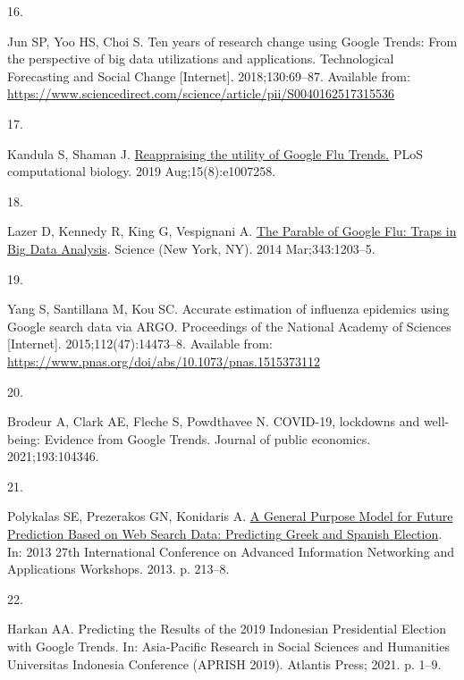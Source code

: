 \documentclass[
  letterpaper,
  DIV=11,
  numbers=noendperiod]{scrartcl}
\newlength{\cslhangindent}
\newlength{\csllabelwidth}
\newlength{\cslentryspacingunit} %
\newenvironment{CSLReferences}[2] %
 {%
  \setlength{\parindent}{0pt}
  \ifodd #1
  \let\oldpar\par
  \def\par{\hangindent=\cslhangindent\oldpar}
  \fi
  \setlength{\parskip}{#2\cslentryspacingunit}
 }%
 {}
\newcommand{\CSLLeftMargin}[1]{\parbox[t]{\csllabelwidth}{#1}}
\newcommand{\CSLRightInline}[1]{\parbox[t]{\linewidth - \csllabelwidth}{#1}\break}
\begin{document}
\begin{CSLReferences}{0}{0}
\leavevmode{}%
\CSLLeftMargin{16. }%
\CSLRightInline{Jun SP, Yoo HS, Choi S. Ten years of research change
using {Google} {Trends}: {From} the perspective of big data utilizations
and applications. Technological Forecasting and Social Change
{[}Internet{]}. 2018;130:69--87. Available from:
\url{https://www.sciencedirect.com/science/article/pii/S0040162517315536}}

\leavevmode{}%
\CSLLeftMargin{17. }%
\CSLRightInline{Kandula S, Shaman J.
\href{https://doi.org/10.1371/journal.pcbi.1007258}{Reappraising the
utility of {Google} {Flu} {Trends}.} PLoS computational biology. 2019
Aug;15(8):e1007258. }

\leavevmode{}%
\CSLLeftMargin{18. }%
\CSLRightInline{Lazer D, Kennedy R, King G, Vespignani A.
\href{https://doi.org/10.1126/science.1248506}{The {Parable} of {Google}
{Flu}: {Traps} in {Big} {Data} {Analysis}}. Science (New York, NY). 2014
Mar;343:1203--5. }

\leavevmode{}%
\CSLLeftMargin{19. }%
\CSLRightInline{Yang S, Santillana M, Kou SC. Accurate estimation of
influenza epidemics using {Google} search data via {ARGO}. Proceedings
of the National Academy of Sciences {[}Internet{]}.
2015;112(47):14473--8. Available from:
\url{https://www.pnas.org/doi/abs/10.1073/pnas.1515373112}}

\leavevmode{}%
\CSLLeftMargin{20. }%
\CSLRightInline{Brodeur A, Clark AE, Fleche S, Powdthavee N. {COVID}-19,
lockdowns and well-being: {Evidence} from {Google} {Trends}. Journal of
public economics. 2021;193:104346. }

\leavevmode{}%
\CSLLeftMargin{21. }%
\CSLRightInline{Polykalas SE, Prezerakos GN, Konidaris A.
\href{https://doi.org/10.1109/WAINA.2013.155}{A {General} {Purpose}
{Model} for {Future} {Prediction} {Based} on {Web} {Search} {Data}:
{Predicting} {Greek} and {Spanish} {Election}}. In: 2013 27th
{International} {Conference} on {Advanced} {Information} {Networking}
and {Applications} {Workshops}. 2013. p. 213--8. }

\leavevmode{}%
\CSLLeftMargin{22. }%
\CSLRightInline{Harkan AA. Predicting the {Results} of the 2019
{Indonesian} {Presidential} {Election} with {Google} {Trends}. In:
Asia-{Pacific} {Research} in {Social} {Sciences} and {Humanities}
{Universitas} {Indonesia} {Conference} ({APRISH} 2019). Atlantis Press;
2021. p. 1--9. }


\end{CSLReferences}
\end{document}
